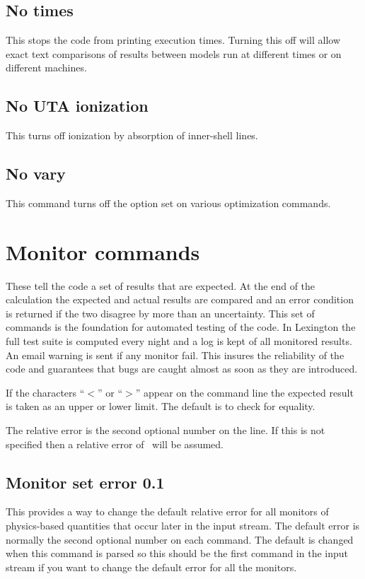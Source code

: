 \subsection{No times}

This stops the code from printing execution times.
Turning this off
will allow exact text comparisons of results between models run at
different times or on different machines.

\subsection{No UTA ionization}

This turns off ionization by absorption of inner-shell lines.

\subsection{No vary}

This command turns off the  option set on
various optimization commands.

\section{Monitor commands}
\label{sec:CommandMonitor}

These tell the code a set of results that are expected.
At the end of
the calculation the expected and actual results are compared and an error
condition is returned if the two disagree by more than an uncertainty.
This set of commands is the foundation for automated testing of the code.
In Lexington the full test suite is computed every night and a log is kept
of all monitored results.
An email warning is sent if any monitor fail.
This insures the reliability of the code and guarantees that bugs are caught
almost as soon as they are introduced.

If the characters ``$<$'' or ``$>$'' appear on the
command line the expected result is taken as an upper or lower limit.
The default is to check for equality.

The relative error is the second optional number on the line.
If this
is not specified then a relative error of \ErrorDefault\ will be assumed.

\subsection{Monitor set error 0.1}

This provides a way to change the default relative error for all monitors
of physics-based quantities that occur later in the input stream.
The default error is normally the second optional number on each
 command.
The default is changed when this command is parsed so this should
be the first  command in the input stream if
you want to change the default error for all the monitors.

